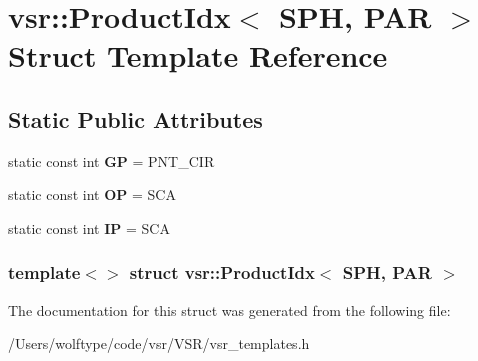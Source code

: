 \hypertarget{structvsr_1_1_product_idx_3_01_s_p_h_00_01_p_a_r_01_4}{\section{vsr\-:\-:Product\-Idx$<$ S\-P\-H, P\-A\-R $>$ Struct Template Reference}
\label{structvsr_1_1_product_idx_3_01_s_p_h_00_01_p_a_r_01_4}
}
\subsection*{Static Public Attributes}
\begin{DoxyCompactItemize}
\item 
\hypertarget{structvsr_1_1_product_idx_3_01_s_p_h_00_01_p_a_r_01_4_afa041e701436af325d1d42de5076e5af}{static const int {\bfseries G\-P} = P\-N\-T\-\_\-\-C\-I\-R}\label{structvsr_1_1_product_idx_3_01_s_p_h_00_01_p_a_r_01_4_afa041e701436af325d1d42de5076e5af}

\item 
\hypertarget{structvsr_1_1_product_idx_3_01_s_p_h_00_01_p_a_r_01_4_a9793056cc3328b10b3531fca2fa7dee3}{static const int {\bfseries O\-P} = S\-C\-A}\label{structvsr_1_1_product_idx_3_01_s_p_h_00_01_p_a_r_01_4_a9793056cc3328b10b3531fca2fa7dee3}

\item 
\hypertarget{structvsr_1_1_product_idx_3_01_s_p_h_00_01_p_a_r_01_4_ae8ce44cddbae70b89ee7b57669d68177}{static const int {\bfseries I\-P} = S\-C\-A}\label{structvsr_1_1_product_idx_3_01_s_p_h_00_01_p_a_r_01_4_ae8ce44cddbae70b89ee7b57669d68177}

\end{DoxyCompactItemize}
\subsubsection*{template$<$$>$ struct vsr\-::\-Product\-Idx$<$ S\-P\-H, P\-A\-R $>$}



The documentation for this struct was generated from the following file\-:\begin{DoxyCompactItemize}
\item 
/\-Users/wolftype/code/vsr/\-V\-S\-R/vsr\-\_\-templates.\-h\end{DoxyCompactItemize}
